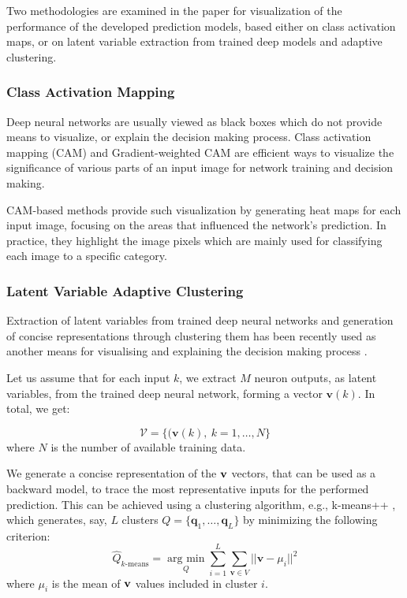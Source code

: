 \documentclass[journal,article,accept,moreauthors,pdftex]{Definitions/mdpi}
\begin{document}
Two methodologies are examined in the paper
for visualization of the performance of the developed prediction models, based either on class activation maps, or on latent variable extraction from trained deep models and adaptive clustering.

\subsubsection{Class Activation Mapping}

Deep neural networks are usually  viewed as black boxes which do not provide means to visualize, or explain the decision making process.   
Class activation mapping (CAM) \cite{ref17} and Gradient-weighted CAM \cite{ref47} are efficient ways to visualize the significance of  various parts of an input image for network training and decision making.

CAM-based methods provide such visualization by generating heat maps for each input image, focusing on the areas that influenced the network's prediction. In practice, they highlight the image pixels which are mainly used for classifying each image to a specific category. 

 
\subsubsection{Latent Variable Adaptive Clustering} 

Extraction of latent variables from trained deep neural networks and generation of concise representations through clustering them has been recently used as another means for visualising and explaining the decision making process \cite{ref1, ref2, ref41}.  

Let us assume that for each  input $k$, we extract $M$ neuron outputs, as latent variables, from the trained deep neural network, forming a vector ${\textbf{v}}(k)$. In total, we get:

\begin{equation}
\label{eq:traininglatent}
\mathcal{V} = \big\{({\textbf{v}}(k), \ k=1,\ldots,N\big\} 
\end{equation}
where $N$ is the number of available training data. 

We generate a concise representation of the $\textbf v$ vectors, that can be used as a backward model, to trace the most representative  inputs for the performed prediction.  This can be achieved using a clustering algorithm, e.g., k-means++ \cite {arthur2006kICCV}, which generates, 
say, $L$ clusters  ${Q} =\{\textbf{q}_1,\ldots,\textbf{q}_L\}$ by minimizing the following criterion: 
\begin{equation}
\label{eq:kmeans}
\widehat{{Q}}_{k\text{-means}} = \underset{{Q}}{\operatorname{arg\ min}} 
\sum_{i=1}^{L} \sum_{\mathbf{v}\in {V}}^{} 
\big|\big|\textbf{v}-\textbf{$\mu$}_{i}\big|\big|^{2}
\end{equation}
where $\textbf{$\mu$}_{i}$ is the mean of $\textbf v$ values included in cluster $i$. 
\end{document}
